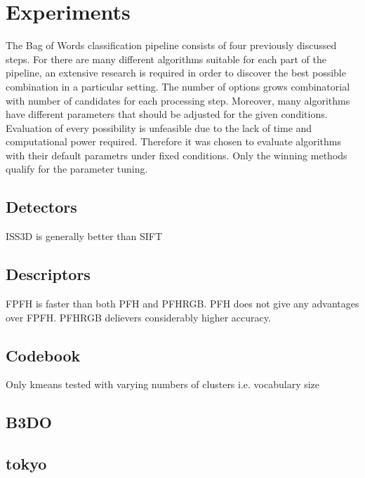 \section{Experiments}

	The Bag of Words classification pipeline consists of four previously discussed steps. For there are many different algorithms suitable for each part of the pipeline, an extensive research is required in order to discover the best possible combination in a particular setting. The number of options grows combinatorial with number of candidates for each processing step. Moreover, many algorithms have different parameters that should be adjusted for the given conditions. Evaluation of every possibility is unfeasible due to the lack of time and computational power required. Therefore it was chosen to evaluate algorithms with their default parametrs under fixed conditions. Only the winning methods qualify for the parameter tuning. 

\subsection{Detectors}

	ISS3D is generally better than SIFT

\subsection{Descriptors}

	FPFH is faster than both PFH and PFHRGB. PFH does not give any advantages over FPFH. PFHRGB delievers considerably higher accuracy.
	
\subsection{Codebook}

Only kmeans tested with varying numbers of clusters i.e. vocabulary size

\subsection{B3DO}



\subsection{tokyo}
